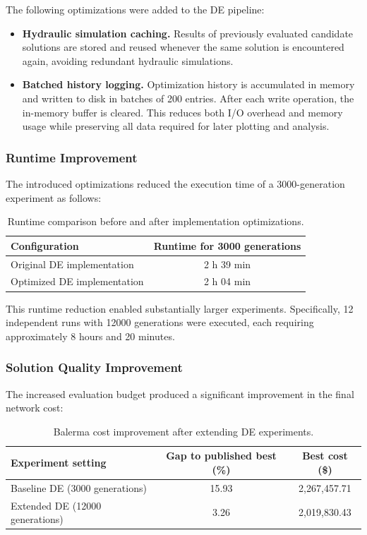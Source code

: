 \documentclass[12pt, a4paper]{article}
\begin{document}
The following optimizations were added to the DE pipeline:

\begin{itemize}
    \item \textbf{Hydraulic simulation caching.}  
    Results of previously evaluated candidate solutions are stored and reused whenever the same solution is encountered again, avoiding redundant hydraulic simulations.

    \item \textbf{Batched history logging.}  
    Optimization history is accumulated in memory and written to disk in batches of 200 entries. After each write operation, the in-memory buffer is cleared. This reduces both I/O overhead and memory usage while preserving all data required for later plotting and analysis.
\end{itemize}

\subsubsection{Runtime Improvement}

The introduced optimizations reduced the execution time of a 3000-generation experiment as follows:

\begin{table}[H]
\centering
\caption{Runtime comparison before and after implementation optimizations.}
\label{tab:bin-runtime-improvement}
\small
\begin{tabular}{l c}
\hline
Configuration & Runtime for 3000 generations \\
\hline
Original DE implementation & 2 h 39 min \\
Optimized DE implementation & 2 h 04 min \\
\hline
\end{tabular}
\end{table}

This runtime reduction enabled substantially larger experiments. Specifically, 12 independent runs with 12000 generations were executed, each requiring approximately 8 hours and 20 minutes.

\subsubsection{Solution Quality Improvement}

The increased evaluation budget produced a significant improvement in the final network cost:

\begin{table}[H]
\centering
\caption{Balerma cost improvement after extending DE experiments.}
\label{tab:bin-cost-improvement}
\small
\begin{tabular}{l c c}
\hline
Experiment setting & Gap to published best (\%) & Best cost (\$) \\
\hline
Baseline DE (3000 generations) & 15.93 & 2,267,457.71 \\
Extended DE (12000 generations) & 3.26 & 2,019,830.43 \\
\hline
\end{tabular}
\end{table}
\end{document}
